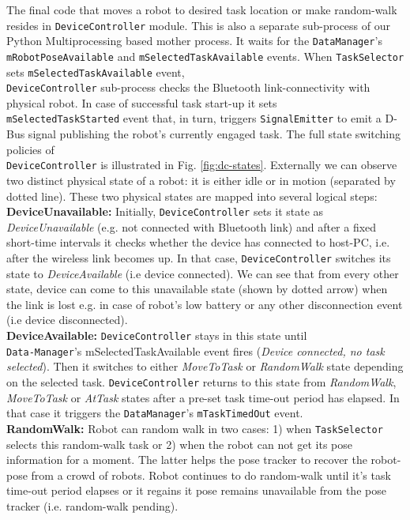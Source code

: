 \documentclass[final,5p,times,twocolumn]{elsarticle}
\begin{document}
The final code that moves a robot to desired task location or make random-walk resides in \texttt{DeviceController} module. This is also a separate sub-process of our Python Multiprocessing based mother process. It waits for the \texttt{DataManager}'s \texttt{mRobotPoseAvailable} and \texttt{mSelectedTaskAvailable} events. When \texttt{TaskSelector} sets  \texttt{mSelectedTaskAvailable} event,\\ \texttt{DeviceController} sub-process checks the Bluetooth link-connectivity with physical robot. In case of successful task start-up it sets\\ \texttt{mSelectedTaskStarted} event that, in turn, triggers \texttt{SignalEmitter} to emit a D-Bus signal publishing the robot's currently engaged task. The full state switching policies of\\ \texttt{DeviceController} is illustrated in Fig. \ref{fig:dc-states}. Externally we can observe two distinct physical state of a robot: it is either idle or in motion (separated by dotted line). These two physical states are mapped into several logical steps:\\
\textbf{DeviceUnavailable: }
Initially, \texttt{DeviceController} sets it state as \textit{DeviceUnavailable} (e.g. not connected with Bluetooth link) and after a fixed short-time intervals it checks whether the device has connected to host-PC, i.e. after the  wireless link becomes up. In that case, \texttt{DeviceController} switches its state to \textit{DeviceAvailable} (i.e device connected). We can see that from every other state, device can come to this unavailable state (shown by dotted arrow) when the  link is lost e.g. in case of robot's low battery or any other disconnection event (i.e device disconnected).\\
\textbf{DeviceAvailable: }
\texttt{DeviceController} stays in this state until\\ \texttt{Data-Manager}'s mSelectedTaskAvailable event fires ({\em Device connected, no task selected}). Then it switches to either \textit{MoveToTask} or \textit{RandomWalk} state depending on the selected task.  \texttt{DeviceController}  returns to this state from \textit{RandomWalk}, \textit{MoveToTask} or \textit{AtTask} states after a pre-set task time-out period has elapsed.  In that case it triggers the \texttt{DataManager}'s \texttt{mTaskTimedOut} event.\\
\textbf{RandomWalk: }
Robot can random walk in two cases: 1) when \texttt{TaskSelector} selects this random-walk task or 2) when the robot can not get its pose information for a moment. The latter helps the pose tracker to recover the robot-pose from a crowd of robots. Robot continues to do random-walk until it's task time-out period elapses or it regains it pose remains unavailable from the pose tracker (i.e. random-walk pending).\\
\end{document}
